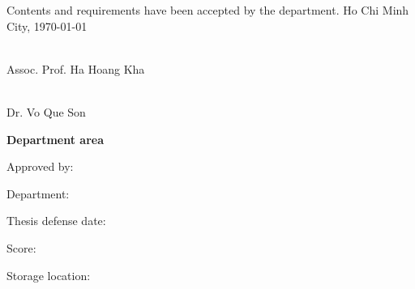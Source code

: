 \documentclass[\main/main.tex]{subfiles}
\begin{document}
Contents and requirements have been accepted by the department.
\newline\newline
Ho Chi Minh City, \today

\vspace{10mm}

\begin{minipage}{0.45\textwidth}

    \begin{center}
        \textbf{\fontsize{14}{12}\selectfont{
            HEAD OF DEPARTMENT}}\\
            \vspace{2cm}
            Assoc. Prof. Ha Hoang Kha
    \end{center}
\end{minipage}
\hfill
\begin{minipage}{0.45\textwidth}
    \begin{center}
        \textbf{\fontsize{14}{12}\selectfont{SUPERVISOR}} \\
        \vspace{2cm}
        Dr. Vo Que Son
    \end{center}
\end{minipage}

\newpage

\textbf{Department area}

Approved by:

Department:

Thesis defense date:

Score:

Storage location:
\end{document}
